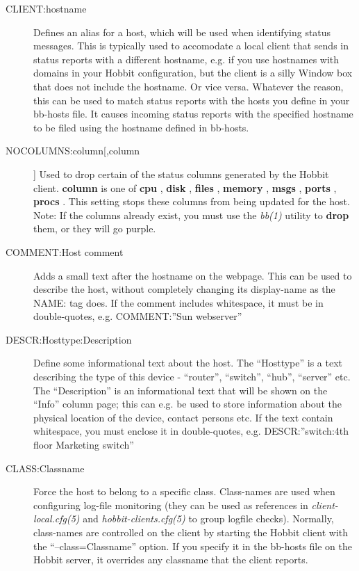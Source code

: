 \begin{description}
 

\item[CLIENT:hostname] Defines an alias for a host, which will be used
  when identifying status messages. This is typically used to
  accomodate a local client that sends in status reports with a
  different hostname, e.g. if you use hostnames with domains in your
  Hobbit configuration, but the client is a silly Window box that does
  not include the hostname. Or vice versa. Whatever the reason, this
  can be used to match status reports with the hosts you define in
  your bb-hosts file. It causes incoming status reports with the
  specified hostname to be filed using the hostname defined in
  bb-hosts. 


 

\item[NOCOLUMNS:column[,column]] Used to drop certain of the status columns generated by the Hobbit client. \textbf{column}
 is one of \textbf{cpu}
, \textbf{disk}
, \textbf{files}
, \textbf{memory}
, \textbf{msgs}
, \textbf{ports}
, \textbf{procs}
. This setting stops these columns from being updated for the host. Note: If the columns already exist, you must use the \emph{bb(1)}
 utility to \textbf{drop}
 them, or they will go purple. 

 

\item[COMMENT:Host comment] Adds a small text after the hostname on
  the webpage. This can be used to describe the host, without
  completely changing its display-name as the NAME: tag does. If the
  comment includes whitespace, it must be in double-quotes,
  e.g. COMMENT:''Sun webserver'' 


 

\item[DESCR:Hosttype:Description] Define some informational text about
  the host. The ``Hosttype'' is a text describing the type of this
  device - ``router'', ``switch'', ``hub'', ``server'' etc. The
  ``Description'' is an informational text that will be shown on the
  ``Info'' column page; this can e.g. be used to store information
  about the physical location of the device, contact persons etc. If
  the text contain whitespace, you must enclose it in double-quotes,
  e.g. DESCR:''switch:4th floor Marketing switch'' 


 

\item[CLASS:Classname] Force the host to belong to a specific
  class. Class-names are used when configuring log-file monitoring
  (they can be used as references in \emph{client-local.cfg(5)} and
  \emph{hobbit-clients.cfg(5)} to group logfile checks). Normally,
  class-names are controlled on the client by starting the Hobbit
  client with the ``--class=Classname'' option. If you specify it in
  the bb-hosts file on the Hobbit server, it overrides any classname
  that the client reports. 



\end{description}
